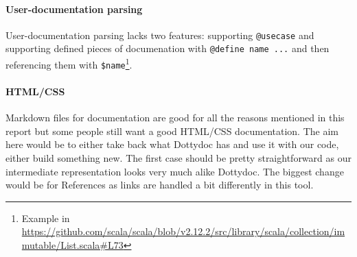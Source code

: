 \documentclass{report}
\begin{document}
\paragraph{User-documentation parsing}
User-documentation parsing lacks two features: supporting \texttt{@usecase} and supporting defined pieces of documenation with \texttt{@define name ...} and then referencing them with \texttt{\$name}\footnote{Example in \url{https://github.com/scala/scala/blob/v2.12.2/src/library/scala/collection/immutable/List.scala\#L73}}.

\paragraph{HTML/CSS}
Markdown files for documentation are good for all the reasons mentioned in this report but some people still want a good HTML/CSS documentation. The aim here would be to either take back what Dottydoc has and use it with our code, either build something new. The first case should be pretty straightforward as our intermediate representation looks very much alike Dottydoc. The biggest change would be for References as links are handled a bit differently in this tool.
\end{document}
